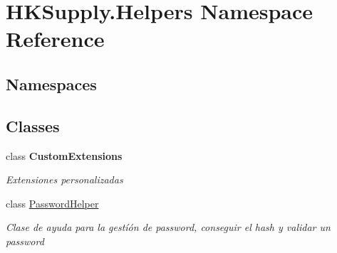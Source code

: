 \hypertarget{namespace_h_k_supply_1_1_helpers}{}\section{H\+K\+Supply.\+Helpers Namespace Reference}
\label{namespace_h_k_supply_1_1_helpers}
\subsection*{Namespaces}
\begin{DoxyCompactItemize}
\end{DoxyCompactItemize}
\subsection*{Classes}
\begin{DoxyCompactItemize}
\item 
class {\bfseries Custom\+Extensions}
\begin{DoxyCompactList}\small\item\em Extensiones personalizadas \end{DoxyCompactList}\item 
class \hyperlink{class_h_k_supply_1_1_helpers_1_1_password_helper}{Password\+Helper}
\begin{DoxyCompactList}\small\item\em Clase de ayuda para la gestíón de password, conseguir el hash y validar un password \end{DoxyCompactList}\end{DoxyCompactItemize}
